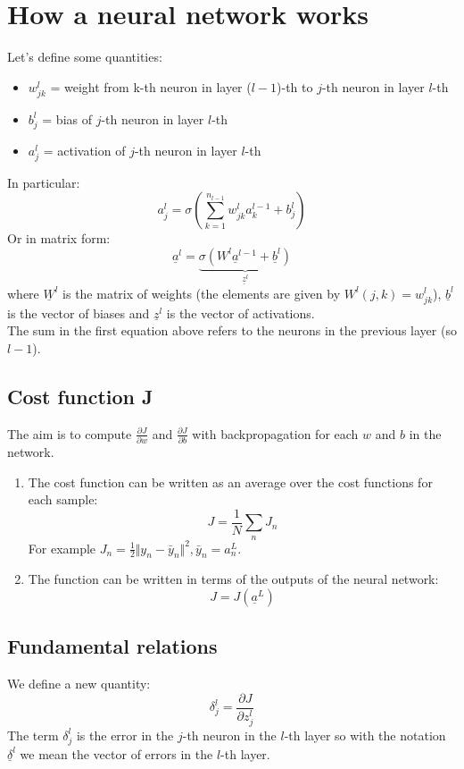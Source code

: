 \section{How a neural network works}
Let's define some quantities:
\begin{itemize}
    \item $w_{jk}^l$ = weight from k-th neuron in layer ($l-1$)-th to $j$-th neuron in layer $l$-th
    \item $b_j^l$ = bias of $j$-th neuron in layer $l$-th
    \item $a_j^l$ = activation of $j$-th neuron in layer $l$-th
\end{itemize}
In particular:
\[
    a_j^l = \sigma\left(\sum_{k=1}^{n_{l-1}} w_{jk}^l a_k^{l-1} + b_j^l\right)    
\]
Or in matrix form:
\[
    \underline{a}^l = \underbrace{\sigma(W^l \underline{a}^{l-1} + \underline{b}^l)}_{\underline{z}^l}
\]
where $\underline{W}^l$ is the matrix of weights (the elements are given by $W^l(j,k) = w_{jk}^l$), $\underline{b}^l$ is the vector of biases and $\underline{z}^l$ is the vector of activations.\\
The sum in the first equation above refers to the neurons in the previous layer (so $l-1$).

\subsection{Cost function J}
The aim is to compute $\frac{\partial J}{\partial w}$ and $\frac{\partial J}{\partial b}$ with backpropagation for each $w$ and $b$ in the network.
\begin{enumerate}
    \item The cost function can be written as an average over the cost functions for each sample:
    \[
        J = \dfrac{1}{N} \sum_n J_n    
    \]
    For example $J_n = \frac{1}{2}\Vert y_n - \bar{y}_n \Vert^2, \bar{y}_n = a_n^L$.
    \item The function can be written in terms of the outputs of the neural network:
    \[
        J = J(\underline{a}^L)    
    \]
\end{enumerate}

\subsection{Fundamental relations}
We define a new quantity:
\[
    \delta_j^l = \dfrac{\partial J}{\partial z_j^l}    
\]
The term $\delta_j^l$ is the error in the $j$-th neuron in the $l$-th layer so with the notation $\underline{\delta}^l$ we mean the vector of errors in the $l$-th layer.\\

